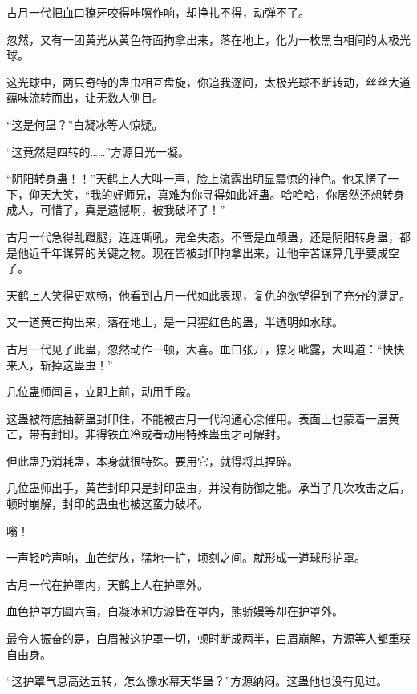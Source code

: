 
\begin{this_body}



古月一代把血口獠牙咬得咔嚓作响，却挣扎不得，动弹不了。

忽然，又有一团黄光从黄色符面拘拿出来，落在地上，化为一枚黑白相间的太极光球。

这光球中，两只奇特的蛊虫相互盘旋，你追我逐间，太极光球不断转动，丝丝大道蕴味流转而出，让无数人侧目。

“这是何蛊？”白凝冰等人惊疑。

“这竟然是四转的……”方源目光一凝。

“阴阳转身蛊！！”天鹤上人大叫一声，脸上流露出明显震惊的神色。他呆愣了一下，仰天大笑，“我的好师兄，真难为你寻得如此好蛊。哈哈哈，你居然还想转身成人，可惜了，真是遗憾啊，被我破坏了！”

古月一代急得乱蹬腿，连连嘶吼，完全失态。不管是血颅蛊，还是阴阳转身蛊，都是他近千年谋算的关键之物。现在皆被封印拘拿出来，让他辛苦谋算几乎要成空了。

天鹤上人笑得更欢畅，他看到古月一代如此表现，复仇的欲望得到了充分的满足。

又一道黄芒拘出来，落在地上，是一只猩红色的蛊，半透明如水球。

古月一代见了此蛊，忽然动作一顿，大喜。血口张开，獠牙呲露，大叫道：“快快来人，斩掉这蛊虫！”

几位蛊师闻言，立即上前，动用手段。

这蛊被符底抽薪蛊封印住，不能被古月一代沟通心念催用。表面上也蒙着一层黄芒，带有封印。非得铁血冷或者动用特殊蛊虫才可解封。

但此蛊乃消耗蛊，本身就很特殊。要用它，就得将其捏碎。

几位蛊师出手，黄芒封印只是封印蛊虫，并没有防御之能。承当了几次攻击之后，顿时崩解，封印的蛊虫也被这蛮力破坏。

嗡！

一声轻吟声响，血芒绽放，猛地一扩，顷刻之间。就形成一道球形护罩。

古月一代在护罩内，天鹤上人在护罩外。

血色护罩方圆六亩，白凝冰和方源皆在罩内，熊骄嫚等却在护罩外。

最令人振奋的是，白眉被这护罩一切，顿时断成两半，白眉崩解，方源等人都重获自由身。

“这护罩气息高达五转，怎么像水幕天华蛊？”方源纳闷。这蛊他也没有见过。


\end{this_body}
